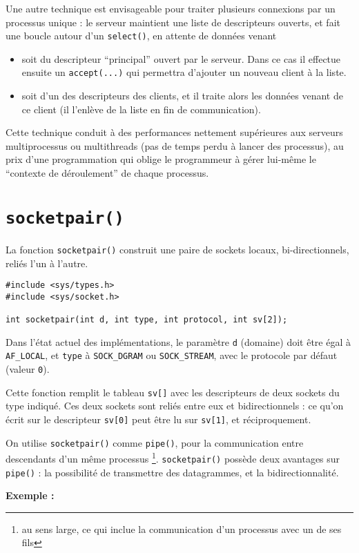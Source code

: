 Une autre technique est envisageable pour traiter plusieurs connexions par un 
processus unique : le serveur maintient une liste de descripteurs 
ouverts, et fait une boucle autour d'un 
\texttt{select()}, en attente de données venant
\begin{itemize}
\item soit du descripteur ``principal'' ouvert par le serveur. Dans ce cas il
effectue ensuite un \texttt{accept(...)} qui permettra d'ajouter un
nouveau client à la liste.
\item soit d'un des descripteurs des clients, et il traite alors les données
venant de ce client (il l'enlève de la liste en fin de communication).
\end{itemize}
Cette technique conduit à des performances nettement supérieures aux
serveurs multiprocessus ou multithreads (pas de temps perdu à lancer
des processus), au prix d'une programmation qui oblige le programmeur
à gérer lui-même le ``contexte de déroulement'' de chaque processus.



\source



\section{\texttt{socketpair()}}

\label{socketpair}

La fonction \texttt{socketpair()} construit une paire de sockets
locaux, bi-directionnels,  reliés l'un à l'autre.


\extrait
\begin{lstlisting}
#include <sys/types.h>
#include <sys/socket.h>

int socketpair(int d, int type, int protocol, int sv[2]);
\end{lstlisting}


Dans l'état actuel des implémentations, le paramètre \texttt{d}
(domaine) doit être égal à \texttt{AF\_LOCAL}, et \texttt{type} à
\texttt{SOCK\_DGRAM} ou \texttt{SOCK\_STREAM}, avec le protocole par
défaut (valeur \texttt{0}).


Cette fonction remplit le tableau \texttt{sv[]} avec les descripteurs
de deux sockets du type indiqué. Ces deux sockets sont reliés entre
eux et bidirectionnels : ce qu'on écrit sur le descripteur
\texttt{sv[0]} peut être lu sur \texttt{sv[1]}, et réciproquement.


On utilise \texttt{socketpair()} comme \texttt{pipe()}, pour la
communication entre descendants d'un même processus \footnote{au sens
large, ce qui inclue la communication d'un processus avec un de ses
fils}. \texttt{socketpair()} possède deux avantages sur
\texttt{pipe()} : la possibilité de transmettre des datagrammes, et la
bidirectionnalité.


\textbf{Exemple :}


\source



